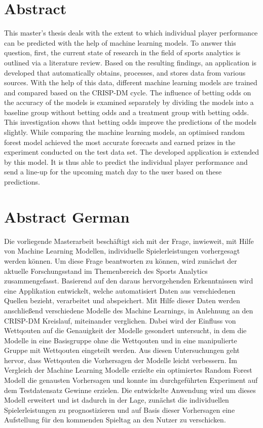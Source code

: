 \chapter*{Abstract}

This master's thesis deals with the extent to which individual player performance can be predicted with the help of machine learning models. To answer this question, first, the current state of research in the field of sports analytics is outlined via a literature review. Based on the resulting findings, an application is developed that automatically obtains, processes, and stores data from various sources. With the help of this data, different machine learning models are trained and compared based on the CRISP-DM cycle. The influence of betting odds on the accuracy of the models is examined separately by dividing the models into a baseline group without betting odds and a treatment group with betting odds. This investigation shows that betting odds improve the predictions of the models slightly. While comparing the machine learning models, an optimised random forest model achieved the most accurate forecasts and earned prizes in the experiment conducted on the test data set. The developed application is extended by this model. It is thus able to predict the individual player performance and send a line-up for the upcoming match day to the user based on these predictions.

\clearpage \chapter*{Abstract German}

Die vorliegende Masterarbeit beschäftigt sich mit der Frage, inwieweit, mit Hilfe von Machine Learning Modellen, individuelle Spielerleistungen vorhergesagt werden können. Um diese Frage beantworten zu können, wird zunächst der aktuelle Forschungsstand im Themenbereich des Sports Analytics zusammengefasst. Basierend auf den daraus hervorgehenden Erkenntnissen wird eine Applikation entwickelt, welche automatisiert Daten aus verschiedenen Quellen bezieht, verarbeitet und abspeichert. Mit Hilfe dieser Daten werden anschließend verschiedene Modelle des Machine Learnings, in Anlehnung an den CRISP-DM Kreislauf, miteinander verglichen. Dabei wird der Einfluss von Wettqouten auf die Genauigkeit der Modelle gesondert untersucht, in dem die Modelle in eine Basisgruppe ohne die Wettqouten und in eine manipulierte Gruppe mit Wettqouten eingeteilt werden. Aus diesen Untersuchungen geht hervor, dass Wettqouten die Vorhersagen der Modelle leicht verbessern. Im Vergleich der Machine Learning Modelle erzielte ein optimiertes Random Forest Modell die genausten Vorhersagen und konnte im durchgeführten Experiment auf dem Testdatensatz Gewinne erzielen. Die entwickelte Anwendung wird um dieses Modell erweitert und ist dadurch in der Lage, zunächst die individuellen Spielerleistungen zu prognostizieren und auf Basis dieser Vorhersagen eine Aufstellung für den kommenden Spieltag an den Nutzer zu verschicken.

